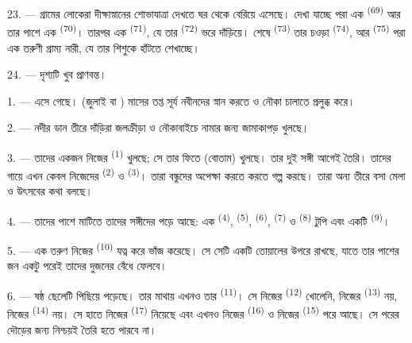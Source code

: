 23. --- গ্রামের লোকেরা দীক্ষাস্নানের শোভাযাত্রা দেখতে ঘর থেকে বেরিয়ে
এসেছে। দেখা যাচ্ছে  পরা এক 
\textsuperscript{(69)} আর তার পাশে এক  \textsuperscript{(70)}।
তারপর এক  \textsuperscript{(71)}, যে তার 
\textsuperscript{(72)} ভরে দাঁড়িয়ে। শেষে 
\textsuperscript{(73)} তার চওড়া  \textsuperscript{(74)}, আর
 \textsuperscript{(75)} পরা এক তরুণী গ্রাম্য নারী, যে তার শিশুকে
হাঁটতে শেখাচ্ছে।

24. --- দৃশ্যটি খুব প্রাণবন্ত।
\VUsaut{4.0mm}

\VUsaut{3.0mm}

\VUsaut{2.4mm}

\VUsaut{3.0mm}

1. ---  এসে গেছে।  (জুলাই বা )
মাসের তপ্ত সূর্য নবীনদের স্নান করতে ও নৌকা চালাতে প্রলুব্ধ করে।

2. --- নদীর ডান তীরে দাঁড়িরা জলক্রীড়া ও নৌকাবাইচে নামার জন্য জামাকাপড়
খুলছে।

3. --- তাদের একজন নিজের  \textsuperscript{(1)} খুলছে; সে তার ফিতে
(বোতাম) খুলছে। তার দুই সঙ্গী আগেই তৈরি। তাদের গায়ে এখন কেবল নিজেদের
 \textsuperscript{(2)} ও 
\textsuperscript{(3)}। তারা বন্ধুদের অপেক্ষা করতে করতে গল্প করছে। তারা অন্য
তীরে বসা মেলা ও উৎসবের কথা বলছে।

4. --- তাদের পাশে মাটিতে তাদের সঙ্গীদের  পড়ে আছে: এক
  \textsuperscript{(4)}, 
\textsuperscript{(5)},  \textsuperscript{(6)}, 
\textsuperscript{(7)} ও  \textsuperscript{(8)} টুপি এবং একটি
 \textsuperscript{(9)}।

5. --- এক তরুণ নিজের  \textsuperscript{(10)} যত্ন করে ভাঁজ করেছে।
সে সেটি একটি তোয়ালের উপরে রাখছে, যাতে তার পাশের জন একটু পরেই তাদের দুজনের
 বেঁধে ফেলবে।

6. --- ষষ্ঠ ছেলেটি পিছিয়ে পড়েছে। তার মাথায় এখনও তার 
\textsuperscript{(11)}। সে নিজের  \textsuperscript{(12)} খোলেনি,
নিজের  \textsuperscript{(13)} নয়, নিজের 
\textsuperscript{(14)} নয়। সে হাতে নিজের 
\textsuperscript{(17)} নিয়েছে এবং এখনও নিজের 
\textsuperscript{(16)} ও নিজের  \textsuperscript{(15)} পরে আছে। সে
পরের দৌড়ের জন্য নিশ্চয়ই তৈরি হতে পারবে না।

